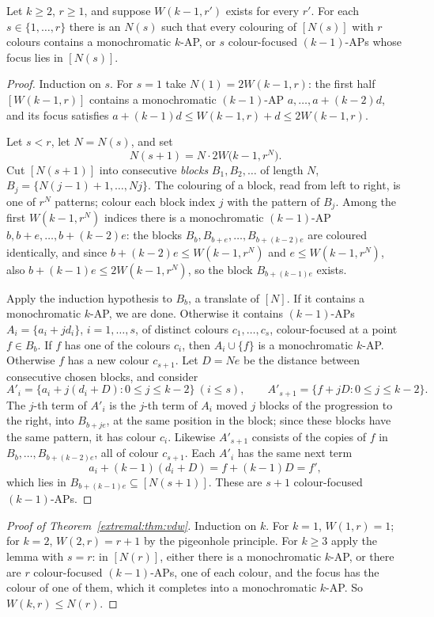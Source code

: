 \begin{lemma}\label{extremal:lem:focus}
Let $k\ge2$, $r\ge1$, and suppose $W(k-1,r')$ exists for every $r'$. For each $s\in\{1,\dots,r\}$ there is an $N(s)$ such that every colouring of $[N(s)]$ with $r$ colours
contains a monochromatic $k$-AP, or $s$ colour-focused $(k-1)$-APs whose focus lies in $[N(s)]$.
\end{lemma}
\begin{proof}
Induction on $s$. For $s=1$ take $N(1)=2W(k-1,r)$: the first half $[W(k-1,r)]$ contains a monochromatic $(k-1)$-AP $a,\dots,a+(k-2)d$, and its focus satisfies
$a+(k-1)d\le W(k-1,r)+d\le2W(k-1,r)$.

Let $s<r$, let $N=N(s)$, and set
\[
N(s+1)=N\cdot2W\bigl(k-1,r^{N}\bigr).
\]
Cut $[N(s+1)]$ into consecutive \emph{blocks} $B_1,B_2,\dots$ of length $N$, $B_j=\{N(j-1)+1,\dots,Nj\}$. The colouring of a block, read from left to right, is one of $r^{N}$
patterns; colour each block index $j$ with the pattern of $B_j$. Among the first $W(k-1,r^{N})$ indices there is a monochromatic $(k-1)$-AP $b,b+e,\dots,b+(k-2)e$: the
blocks $B_b,B_{b+e},\dots,B_{b+(k-2)e}$ are coloured identically, and since $b+(k-2)e\le W(k-1,r^{N})$ and $e\le W(k-1,r^{N})$, also $b+(k-1)e\le2W(k-1,r^{N})$, so the block
$B_{b+(k-1)e}$ exists.

Apply the induction hypothesis to $B_b$, a translate of $[N]$. If it contains a monochromatic $k$-AP, we are done. Otherwise it contains $(k-1)$-APs
$A_i=\{a_i+jd_i\}$, $i=1,\dots,s$, of distinct colours $c_1,\dots,c_s$, colour-focused at a point $f\in B_b$. If $f$ has one of the colours $c_i$, then $A_i\cup\{f\}$ is a monochromatic $k$-AP. Otherwise $f$ has a new colour $c_{s+1}$. Let $D=Ne$ be the distance between
consecutive chosen blocks, and consider
\[
A'_i=\{a_i+j(d_i+D):0\le j\le k-2\}\ (i\le s),\qquad A'_{s+1}=\{f+jD:0\le j\le k-2\}.
\]
The $j$-th term of $A'_i$ is the $j$-th term of $A_i$ moved $j$ blocks of the progression to the right, into $B_{b+je}$, at the same position in the block; since these blocks have
the same pattern, it has colour $c_i$. Likewise $A'_{s+1}$ consists of the copies of $f$ in $B_b,\dots,B_{b+(k-2)e}$, all of colour $c_{s+1}$. Each $A'_i$ has the same next term
\[
a_i+(k-1)(d_i+D)=f+(k-1)D=f',
\]
which lies in $B_{b+(k-1)e}\subseteq[N(s+1)]$. These are $s+1$ colour-focused $(k-1)$-APs.
\end{proof}

\begin{proof}[Proof of Theorem~\ref{extremal:thm:vdw}]
Induction on $k$. For $k=1$, $W(1,r)=1$; for $k=2$, $W(2,r)=r+1$ by the pigeonhole principle. For $k\ge3$ apply the lemma with $s=r$: in $[N(r)]$, either there is a
monochromatic $k$-AP, or there are $r$ colour-focused $(k-1)$-APs, one of each colour, and the focus has the colour of one of them, which it completes into a
monochromatic $k$-AP. So $W(k,r)\le N(r)$.
\end{proof}

